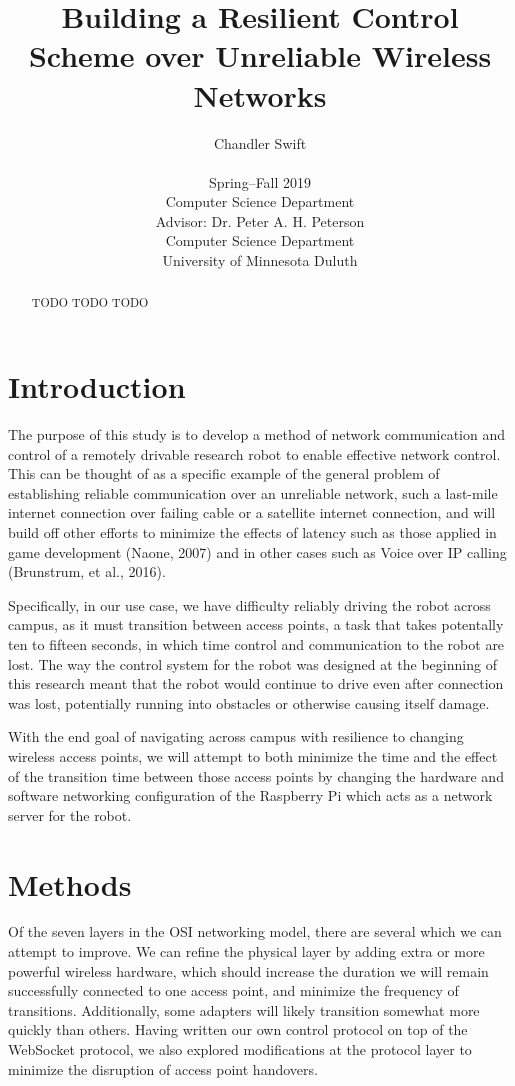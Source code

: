 \documentclass{IEEEtran}
\title{Building a Resilient Control Scheme over Unreliable Wireless Networks}
\author{Chandler Swift \\ ~ \\
  Spring--Fall 2019 \\
  Computer Science Department \\
  Advisor: Dr. Peter A. H. Peterson \\
  Computer Science Department \\
  University of Minnesota Duluth
}
\begin{document}
\maketitle

\begin{abstract}
TODO TODO TODO
\end{abstract}

\section{Introduction}
The purpose of this study is to develop a method of network communication and
control of a remotely drivable research robot to enable effective network
control. This can be thought of as a specific example of the general problem
of establishing reliable communication over an unreliable network, such a
last-mile internet connection over failing cable or a satellite internet
connection, and will build off other efforts to minimize the effects of
latency such as those applied in game development (Naone, 2007) and in other
cases such as Voice over IP calling (Brunstrum,  et al., 2016).

Specifically, in our use case, we have difficulty reliably driving the robot
across campus, as it must transition between access points, a task that takes
potentally ten to fifteen seconds, in which time control and communication to
the robot are lost. The way the control system for the robot was designed at
the beginning of this research meant that the robot would continue to drive
even after connection was lost, potentially running into obstacles or
otherwise causing itself damage.

With the end goal of navigating across campus with resilience to changing
wireless access points, we will attempt to both minimize the time and the
effect of the transition time between those access points by changing the
hardware and software networking configuration of the Raspberry Pi which
acts as a network server for the robot.

\section{Methods}
Of the seven layers in the OSI networking model, there are several which we
can attempt to improve. We can refine the physical layer by adding extra or
more powerful wireless hardware, which should increase the duration we will
remain successfully connected to one access point, and minimize the frequency
of transitions. Additionally, some adapters will likely transition somewhat
more quickly than others. Having written our own control protocol on top of
the WebSocket protocol\cite{protocol}, we also explored modifications at the
protocol layer to minimize the disruption of access point handovers.
\end{document}
